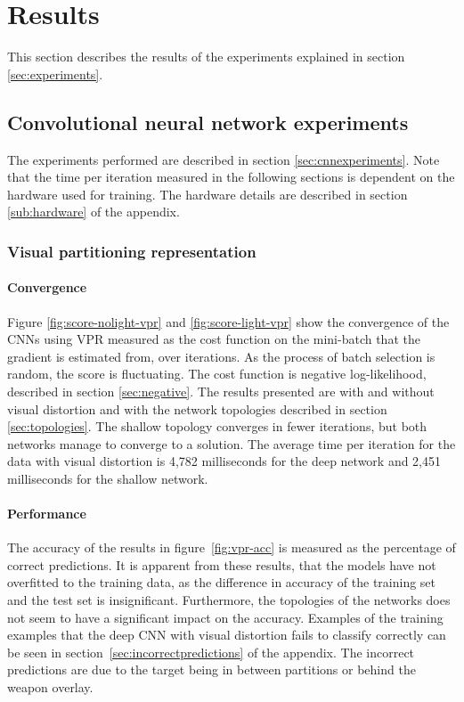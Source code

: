 
\section{Results}
This section describes the results of the experiments explained in section \ref{sec:experiments}.

\label{sec:results}

\subsection{Convolutional neural network experiments}
The experiments performed are described in section \ref{sec:cnnexperiments}. Note that the time per iteration measured in the following sections is dependent on the hardware used for training. The hardware details are described in section \ref{sub:hardware} of the appendix.

\subsubsection{Visual partitioning representation}
\paragraph{Convergence}
Figure \ref{fig:score-nolight-vpr} and \ref{fig:score-light-vpr} show the convergence of the CNNs using VPR measured as the cost function on the mini-batch that the gradient is estimated from, over iterations. As the process of batch selection is random, the score is fluctuating. The cost function is negative log-likelihood, described in section \ref{sec:negative}.
The results presented are with and without visual distortion and with the network topologies described in section \ref{sec:topologies}. The shallow topology converges in fewer iterations, but both networks manage to converge to a solution. The average time per iteration for the data with visual distortion is 4,782 milliseconds for the deep network and 2,451 milliseconds for the shallow network.

\vspace{-5mm}

\paragraph{Performance}
The accuracy of the results in figure~\ref{fig:vpr-acc} is measured as the percentage of correct predictions. It is apparent from these results, that the models have not overfitted to the training data, as the difference in accuracy of the training set and the test set is insignificant. Furthermore, the topologies of the networks does not seem to have a significant impact on the accuracy. Examples of the training examples that the deep CNN with visual distortion fails to classify correctly can be seen in section~\ref{sec:incorrectpredictions} of the appendix. The incorrect predictions are due to the target being in between partitions or behind the weapon overlay.

